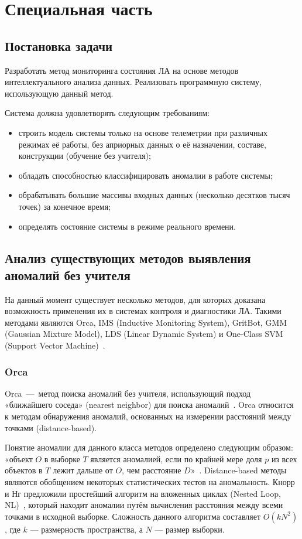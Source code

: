 \chapter{Специальная часть}
\section{Постановка задачи}
Разработать метод мониторинга состояния ЛА на основе методов интеллектуального анализа данных. Реализовать программную систему, использующую данный метод.

Система должна удовлетворять следующим требованиям:
\begin{itemize}
	\item строить модель системы только на основе телеметрии при различных режимах её работы, без априорных данных о её назначении, составе, конструкции (обучение без учителя);
	\item обладать способностью классифицировать аномалии в работе системы;
	\item обрабатывать большие массивы входных данных (несколько десятков тысяч точек) за конечное время;
	\item определять состояние системы в режиме реального времени.
\end{itemize}

\section{Анализ существующих методов выявления аномалий без учителя}
На данный момент существует несколько методов, для которых доказана возможность применения их в системах контроля и диагностики ЛА. Такими методами являются Orca, IMS (Inductive Monitoring System), GritBot, GMM (Gaussian Mixture Model), LDS (Linear Dynamic System) и One-Class SVM (Support Vector Machine)~\cite{MartinCompUnsupervisedDetectionMethods}.

\subsection{Orca}
Orca~---~метод поиска аномалий без учителя, использующий подход «ближайшего соседа» (nearest neighbor) для поиска аномалий~\cite{SchwabacherMachLearnAppl}. Orca относится к методам обнаружения аномалий, основанных на измерении расстояний между точками (distance-based).

Понятие аномалии для данного класса методов определено следующим образом: «объект $O$ в выборке $T$ является аномалией, если по крайней мере доля $p$ из всех объектов в $T$ лежит дальше от $O$, чем расстояние $D$»~\cite{KnorrNgDistBasedAlgorithms}. Distance-based методы являются обобщением некоторых статистических тестов на аномальность. Кнорр и Нг предложили простейший алгоритм на вложенных циклах (Nested Loop, NL)~\cite{KnorrNgDistBasedAlgorithms}, который находит аномалии путём вычисления расстояния между всеми точками в исходной выборке. Сложность данного алгоритма составляет $O(kN^2)$, где $k$ --- размерность пространства, а $N$ --- размер выборки.

